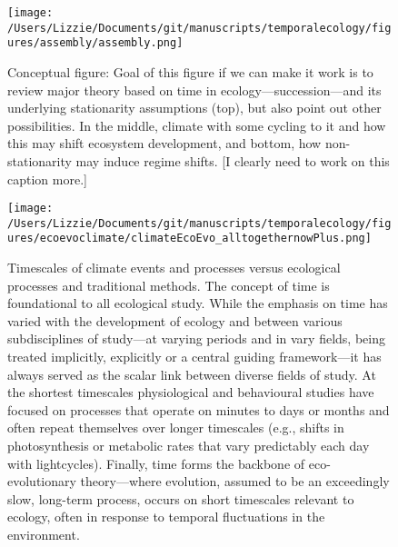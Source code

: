 \documentclass[11pt,a4paper,oneside]{article}
\begin{document}
\begin{figure}[h!]
\centering
\noindent \texttt{[image: /Users/Lizzie/Documents/git/manuscripts/temporalecology/figures/assembly/assembly.png]}
\caption{Conceptual figure: Goal of this figure if we can make it work is to review major theory based on time in ecology---succession---and its underlying stationarity assumptions (top), but also point out other possibilities. In the middle, climate with some cycling to it and how this may shift ecosystem development, and bottom, how non-stationarity may induce regime shifts. [I clearly need to work on this caption more.] \label{successfig}}
\end{figure}

\newpage
\begin{figure}[h!]
\centering
\noindent \texttt{[image: /Users/Lizzie/Documents/git/manuscripts/temporalecology/figures/ecoevoclimate/climateEcoEvo\_alltogethernowPlus.png]}
\caption{Timescales of climate events and processes versus ecological processes and traditional methods. The concept of time is foundational to all ecological study. While the emphasis on time has varied with the development of ecology and between various subdisciplines of study---at varying periods and in vary fields, being treated implicitly, explicitly or a central guiding framework---it has always served as the scalar link between diverse fields of study. At the shortest timescales physiological and behavioural studies have focused on processes that operate on minutes to days or months and often repeat themselves over longer timescales (e.g., shifts in photosynthesis or metabolic rates that vary predictably each day with lightcycles). Finally, time forms the backbone of eco-evolutionary theory---where evolution, assumed to be an exceedingly slow, long-term process, occurs on short timescales relevant to ecology, often in response to temporal fluctuations in the environment.  \label{climatescalesfig}}
\end{figure}
\end{document}
